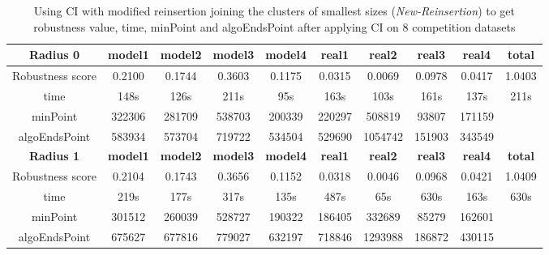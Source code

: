\documentclass{article}
\begin{document}
	 
	\begin{table}[]
	\begin{adjustwidth}{-1cm}{}		
		\begin{threeparttable}		
			\centering
			\caption{Using CI with modified reinsertion joining the clusters of smallest sizes (\textit{New-Reinsertion}) to get robustness value, time, minPoint and algoEndsPoint after applying CI on 8 competition datasets}
			\label{tab:table12}
			\begin{tabular}{|c|c|c|c|c|c|c|c|c|c|}
				\hline
				\textbf{Radius 0} & \textbf{model1} & \textbf{model2} & \textbf{model3} & \textbf{model4} & \textbf{real1} & \textbf{real2} & \textbf{real3} & \textbf{real4} & \textbf{total} \\ \hline
				Robustness score                 & 0.2100    & 0.1744    & 0.3603    & 0.1175    & 0.0315    & 0.0069    & 0.0978    & 0.0417    & 1.0403    \\ \hline
				
				time                             & 148s      & 126s      & 211s      & 95s       & 163s      & 103s      & 161s      & 137s      & 211s      \\ \hline
				minPoint                & 322306          & 281709          & 538703          & 200339          & 220297         & 508819         & 93807          & 171159         &                \\ \hline
				algoEndsPoint           & 583934          & 573704          & 719722          & 534504          & 529690         & 1054742        & 151903         & 343549         &                \\ \hline
				
				\textbf{Radius 1} & \textbf{model1} & \textbf{model2} & \textbf{model3} & \textbf{model4} & \textbf{real1} & \textbf{real2} & \textbf{real3} & \textbf{real4} & \textbf{total} \\ \hline
				Robustness score                 & 0.2104    & 0.1743    & 0.3656    & 0.1152    & 0.0318    & 0.0046    & 0.0968    & 0.0421    & 1.0409    \\ \hline
				
				time                             & 219s      & 177s      & 317s      & 135s      & 487s      & 65s       & 630s      & 163s      & 630s      \\ \hline
				
				minPoint                         & 301512          & 260039          & 528727          & 190322          & 186405         & 332689         & 85279          & 162601         &                \\ \hline
				algoEndsPoint                    & 675627          & 677816          & 779027          & 632197          & 718846         & 1293988        & 186872         & 430115         &                \\ \hline		
				

\end{tabular}
\end{threeparttable}
\end{adjustwidth}
\end{table}
\end{document}
